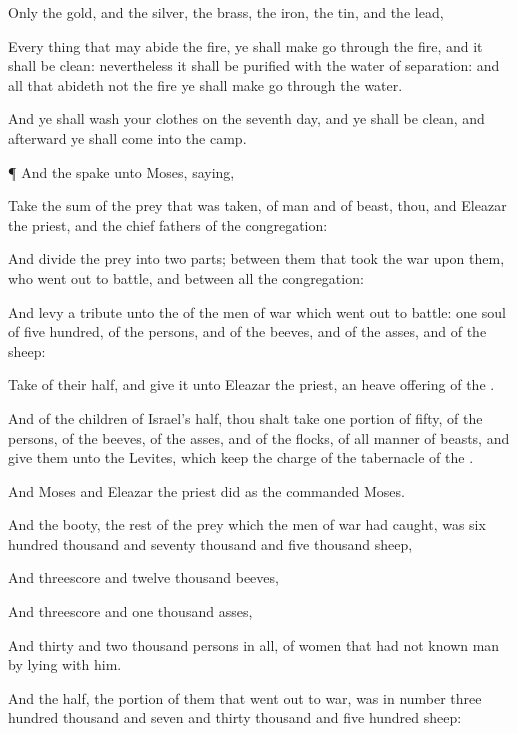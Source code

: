 {Only the
gold, and the
silver, the
brass, the
iron, the
tin, and the
lead,

Every
thing that may
abide the
fire, ye shall make
{} go
through the
fire, and it shall be
clean: nevertheless it shall be
purified with the
water of
separation: and all that
abideth not the
fire ye shall make go
through the
water.

And ye shall
wash your
clothes on the
seventh
day, and ye shall be
clean, and
afterward ye shall
come into the
camp.


\par }{\PP {}¶ And the
{}
spake unto
Moses,
saying,

Take the
sum of the
prey that was
taken,
{} of
man and of
beast, thou, and
Eleazar the
priest, and the
chief
fathers of the
congregation:

And
divide the
prey into two
parts; between them that
took the
war upon them, who went
out to
battle, and between all the
congregation:

And
levy a
tribute unto the
{} of the
men of
war which went
out to
battle:
one
soul of
five
hundred,
{} of the
persons, and of the
beeves, and of the
asses, and of the
sheep:

Take
{} of their
half, and
give it unto
Eleazar the
priest,
{} an heave
offering of the
{}.

And of the
children of
Israel’s
half, thou shalt
take
one
portion of
fifty, of the
persons, of the
beeves, of the
asses, and of the
flocks, of all manner of
beasts, and
give them unto the
Levites, which
keep the
charge of the
tabernacle of the
{}.

And
Moses and
Eleazar the
priest
did as the
{}
commanded
Moses.

And the
booty,
{} the
rest of the
prey which the men
of
war had
caught, was
six
hundred
thousand and
seventy
thousand and
five
thousand
sheep,

And threescore and
twelve
thousand
beeves,

And
threescore and
one
thousand
asses,

And
thirty and
two
thousand
persons in
all, of
women that had not
known
man by
lying with him.

And the
half,
{} the
portion of them that went
out to
war, was in
number
three
hundred
thousand and
seven and
thirty
thousand and
five
hundred
sheep:

}
